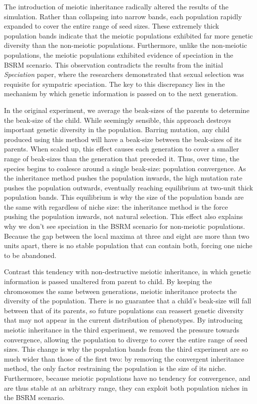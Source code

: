 \documentclass{article}
\begin{document}
The introduction of meiotic inheritance radically altered the results of the simulation. Rather than collapsing into narrow bands, each population rapidly expanded to cover the entire range of seed sizes. These extremely thick population bands indicate that the meiotic populations exhibited far more genetic diversity than the non-meiotic populations. Furthermore, unlike the non-meiotic populations, the meiotic populations exhibited evidence of speciation in the BSRM scenario. This observation contradicts the results from the initial \textit{Speciation} paper, where the researchers demonstrated that sexual selection was requisite for sympatric speciation. The key to this discrepancy lies in the mechanism by which genetic information is passed on to the next generation. 

In the original experiment, we average the beak-sizes of the parents to determine the beak-size of the child. While seemingly sensible, this approach destroys important genetic diversity in the population. Barring mutation, any child produced using this method will have a beak-size between the beak-sizes of its parents. When scaled up, this effect causes each generation to cover a smaller range of beak-sizes than the generation that preceded it. Thus, over time, the species begins to coalesce around a single beak-size: population convergence. As the inheritance method pushes the population inwards, the high mutation rate pushes the population outwards, eventually reaching equilibrium at two-unit thick population bands. This equilibrium is why the size of the population bands are the same with regardless of niche size: the inheritance method is the force pushing the population inwards, not natural selection. This effect also explains why we don’t see speciation in the BSRM scenario for non-meiotic populations. Because the gap between the local maxima at three and eight are more than two units apart, there is no stable population that can contain both, forcing one niche to be abandoned.

Contrast this tendency with non-destructive meiotic inheritance, in which genetic information is passed unaltered from parent to child. By keeping the chromosomes the same between generations, meiotic inheritance protects the diversity of the population. There is no guarantee that a child’s beak-size will fall between that of its parents, so future populations can reassert genetic diversity that may not appear in the current distribution of phenotypes. By introducing meiotic inheritance in the third experiment, we removed the pressure towards convergence, allowing the population to diverge to cover the entire range of seed sizes. This change is why the population bands from the third experiment are so much wider than those of the first two: by removing the convergent inheritance method, the only factor restraining the population is the size of its niche. Furthermore, because meiotic populations have no tendency for convergence, and are thus stable at an arbitrary range, they can exploit both population niches in the BSRM scenario.
\end{document}
